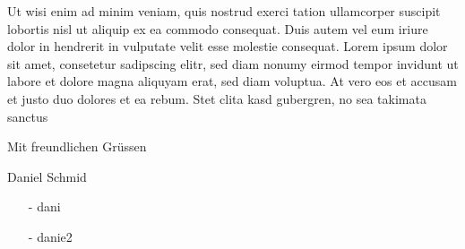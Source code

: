 \documentclass[a4paper,12pt]{letter}
\begin{document}
Ut wisi enim ad minim veniam, quis nostrud exerci tation ullamcorper suscipit lobortis nisl ut aliquip ex ea commodo consequat. Duis autem vel eum iriure dolor in hendrerit in vulputate velit esse molestie consequat. 
Lorem ipsum dolor sit amet, consetetur sadipscing elitr, sed diam nonumy eirmod tempor invidunt ut labore et dolore magna aliquyam erat, sed diam voluptua. At vero eos et accusam et justo duo dolores et ea rebum. Stet clita kasd gubergren, no sea takimata sanctus  
\vspace{10mm}
\par\hspace{90mm}Mit freundlichen Grüssen
\par\vspace{15mm}\hspace{90mm}Daniel Schmid
\begin{itemize}
\item [-] dani
\item [-] danie2 
\end{itemize}
\end{document}
